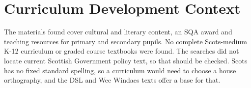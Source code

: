 \documentclass[12pt]{article}
\begin{document}
\section{Curriculum Development Context}
The materials found cover cultural and literary content, an SQA award and teaching resources for primary and secondary pupils. No complete Scots-medium K-12 curriculum or graded course textbooks were found. The searches did not locate current Scottish Government policy text, so that should be checked. Scots has no fixed standard spelling, so a curriculum would need to choose a house orthography, and the DSL and Wee Windaes texts offer a base for that.
\end{document}

